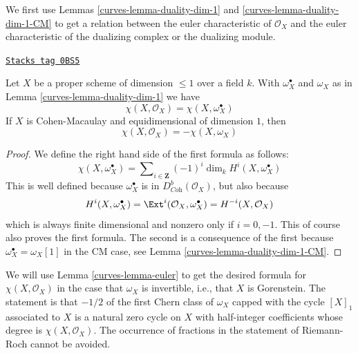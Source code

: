 \medskip\noindent
We first use Lemmas \ref{curves-lemma-duality-dim-1} and \ref{curves-lemma-duality-dim-1-CM}
to get a relation between the euler
characteristic of $\mathcal{O}_X$ and the euler characteristic
of the dualizing complex or the dualizing module.

\begin{lemma}[Euler]
\label{curves-lemma-euler}
\href{https://stacks.math.columbia.edu/tag/0BS5}{\texttt{Stacks tag 0BS5}}

Let $X$ be a proper scheme of dimension $\leq 1$ over a field $k$.
With $\omega_X^\bullet$ and $\omega_X$ as in Lemma \ref{curves-lemma-duality-dim-1}
we have
$$
\chi(X, \mathcal{O}_X) = \chi(X, \omega_X^\bullet)
$$
If $X$ is Cohen-Macaulay and equidimensional of dimension $1$, then
$$
\chi(X, \mathcal{O}_X) = - \chi(X, \omega_X)
$$
\end{lemma}

\begin{proof}

We define the right hand side of the first formula as follows:
$$
\chi(X, \omega_X^\bullet) =
\sum\nolimits_{i \in \mathbf{Z}} (-1)^i\dim_k H^i(X, \omega_X^\bullet)
$$
This is well defined because $\omega_X^\bullet$ is in
$D^b_{\textit{Coh}}(\mathcal{O}_X)$, but also because
$$
H^i(X, \omega_X^\bullet) =
\Ext^i(\mathcal{O}_X, \omega_X^\bullet) =
H^{-i}(X, \mathcal{O}_X)
$$
which is always finite dimensional and nonzero only if $i = 0, -1$.
This of course also proves the first formula. The second is a consequence
of the first because $\omega_X^\bullet = \omega_X[1]$ in the CM case, see
Lemma \ref{curves-lemma-duality-dim-1-CM}.
\end{proof}

We will use Lemma \ref{curves-lemma-euler} to get the desired formula for
$\chi(X, \mathcal{O}_X)$ in the case that $\omega_X$ is
invertible, i.e., that $X$ is Gorenstein.
The statement is that $-1/2$ of the first Chern class of $\omega_X$
capped with the cycle $[X]_1$ associated to $X$ is a natural zero
cycle on $X$ with half-integer coefficients whose degree is
$\chi(X, \mathcal{O}_X)$.
The occurrence of fractions in the statement of Riemann-Roch cannot
be avoided.

